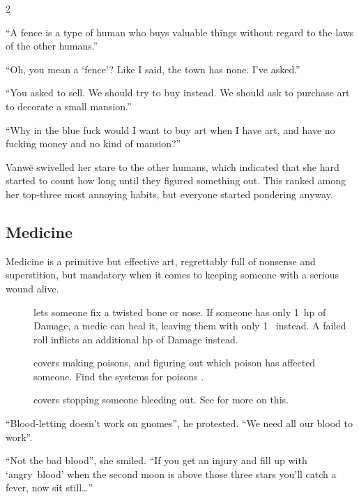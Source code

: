 \begin{multicols}{2}
\begin{exampletext}
  ``A fence is a type of human who buys valuable things without regard to the laws of the other humans.''

  ``Oh, you mean a `fence'?
  Like I said, the town has none.
  I've asked.''

  ``You asked to sell.
  We should try to buy instead.
  We should ask to purchase art to decorate a small mansion.''

  ``Why in the blue fuck would I want to buy art when I have art, and have no fucking money and no kind of mansion?''

  Vanw\"e swivelled her stare to the other humans, which indicated that she hard started to count how long until they figured something out.
  This ranked among her top-three most annoying habits, but everyone started pondering anyway.
\end{exampletext}

\subsection{Medicine}

Medicine is a primitive but effective art, regrettably full of nonsense and superstition, but mandatory when it comes to keeping someone with a serious wound alive.

\begin{description}
  \item[]
    lets someone fix a twisted bone or nose.
    If someone has only 1~\gls{hp} of Damage, a medic can heal it, leaving them with only 1~ instead.
    A failed roll inflicts an additional \gls{hp} of Damage instead.
  \item[]
    covers making poisons, and figuring out which poison has affected someone.
    Find the systems for poisons .
  \item[]
    covers stopping someone bleeding out.
    See  for more on this.
\end{description}

\begin{exampletext}
  ``Blood-letting doesn't work on gnomes'', he protested.
  ``We need all our blood to work''.

  ``Not the bad blood'', she smiled.
  ``If you get an injury and fill up with `angry~blood' when the second moon is above those three stars you'll catch a fever, now sit still\ldots''
\end{exampletext}


\end{multicols}
